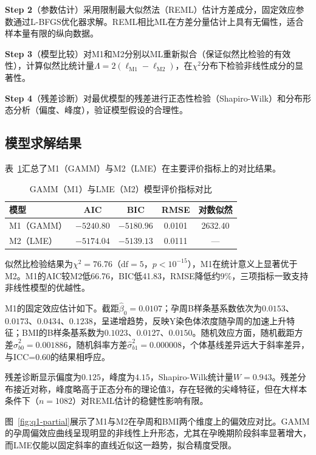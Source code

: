 \documentclass{cumcmthesis}
\begin{document}
\textbf{Step 2}（参数估计）\quad 采用限制最大似然法（REML）估计方差成分，固定效应参数通过L-BFGS优化器求解。REML相比ML在方差分量估计上具有无偏性，适合样本量有限的纵向数据。

\textbf{Step 3}（模型比较）\quad 对M1和M2分别以ML重新拟合（保证似然比检验的有效性），计算似然比统计量$\Lambda = 2(\ell_{\mathrm{M1}} - \ell_{\mathrm{M2}})$，在$\chi^2$分布下检验非线性成分的显著性。

\textbf{Step 4}（残差诊断）\quad 对最优模型的残差进行正态性检验（Shapiro-Wilk）和分布形态分析（偏度、峰度），验证模型假设的合理性。

\subsection{模型求解结果}

表~\ref{tab:q1-compare}汇总了M1（GAMM）与M2（LME）在主要评价指标上的对比结果。

\begin{table}[H]
  \centering
  \caption{GAMM（M1）与LME（M2）模型评价指标对比}\label{tab:q1-compare}
  \begin{tabular}{lcccc}
    \toprule
    模型 & AIC & BIC & RMSE & 对数似然 \\
    \midrule
    M1（GAMM） & $-5240.80$ & $-5180.96$ & 0.0101 & 2632.40 \\
    M2（LME）  & $-5174.04$ & $-5139.13$ & 0.0111 & --- \\
    \bottomrule
  \end{tabular}
\end{table}

似然比检验结果为$\chi^2=76.76$（$\mathrm{df}=5$，$p<10^{-15}$），M1在统计意义上显著优于M2。M1的AIC较M2低66.76，BIC低41.83，RMSE降低约9\%，三项指标一致支持非线性模型的优越性。

M1的固定效应估计如下。截距$\hat{\beta}_0=0.0107$；孕周B样条基系数依次为$0.0153$、$0.0173$、$0.0434$、$0.1238$，呈递增趋势，反映Y染色体浓度随孕周的加速上升特征；BMI的B样条基系数为$0.1023$、$0.0127$、$0.0150$。随机效应方面，随机截距方差$\hat{\sigma}^2_{b0}=0.001886$，随机斜率方差$\hat{\sigma}^2_{b1}=0.000008$，个体基线差异远大于斜率差异，与ICC=0.60的结果相呼应。

残差诊断显示偏度为$0.125$，峰度为$4.15$，Shapiro-Wilk统计量$W=0.943$。残差分布接近对称，峰度略高于正态分布的理论值3，存在轻微的尖峰特征，但在大样本条件下（$n=1082$）对REML估计的稳健性影响有限。

图~\ref{fig:q1-partial}展示了M1与M2在孕周和BMI两个维度上的偏效应对比。GAMM的孕周偏效应曲线呈现明显的非线性上升形态，尤其在孕晚期阶段斜率显著增大，而LME仅能以固定斜率的直线近似这一趋势，拟合精度受限。
\end{document}
